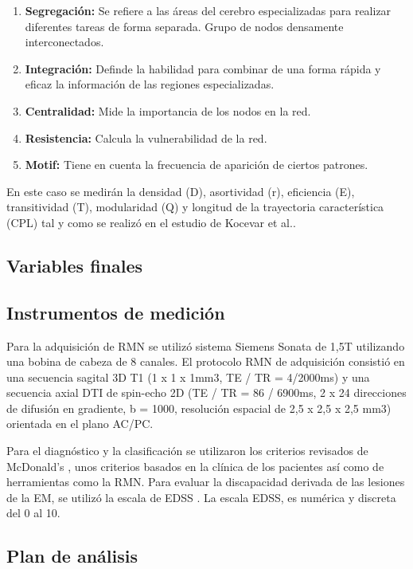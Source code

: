 \documentclass[fleqn,10pt]{UICArticle} %
\begin{document}
\begin{enumerate}[noitemsep]
\item \textbf{Segregación:} Se refiere a las áreas del cerebro especializadas para realizar diferentes tareas de forma separada. Grupo de nodos densamente interconectados.
\item \textbf{Integración:} Definde la habilidad para combinar de una forma rápida y eficaz la información de las regiones especializadas.
\item \textbf{Centralidad:} Mide la importancia de los nodos en la red.
\item \textbf{Resistencia:} Calcula la vulnerabilidad de la red.
\item \textbf{Motif:} Tiene en cuenta la frecuencia de aparición de ciertos patrones.
\end{enumerate}

En este caso se medirán la densidad (D), asortividad (r), eficiencia (E), transitividad (T), modularidad (Q) y longitud de la trayectoria característica (CPL) tal y como se realizó en el estudio de Kocevar et al.\cite{Kocevar2016}.

\subsection{Variables finales}


\subsection{Instrumentos de medición}
Para la adquisición de RMN se utilizó sistema Siemens Sonata de 1,5T utilizando una bobina de cabeza de 8 canales. El protocolo RMN de adquisición consistió en una secuencia sagital 3D T1 (1 x 1 x 1mm3, TE / TR = 4/2000ms) y una secuencia axial DTI de spin-echo 2D (TE / TR = 86 / 6900ms, 2 x 24 direcciones de difusión en gradiente, b = 1000, resolución espacial de 2,5 x 2,5 x 2,5 mm3) orientada en el plano AC/PC.

Para el diagnóstico y la clasificación se utilizaron los criterios revisados de McDonald's \cite{Polman2011}, unos criterios basados en la clínica de los pacientes así como de herramientas como la RMN. Para evaluar la discapacidad derivada de las lesiones de la EM, se utilizó la escala de EDSS \cite{Kurtzke1983}. La escala EDSS, es numérica y discreta del 0 al 10.

\subsection{Plan de análisis}
\end{document}
